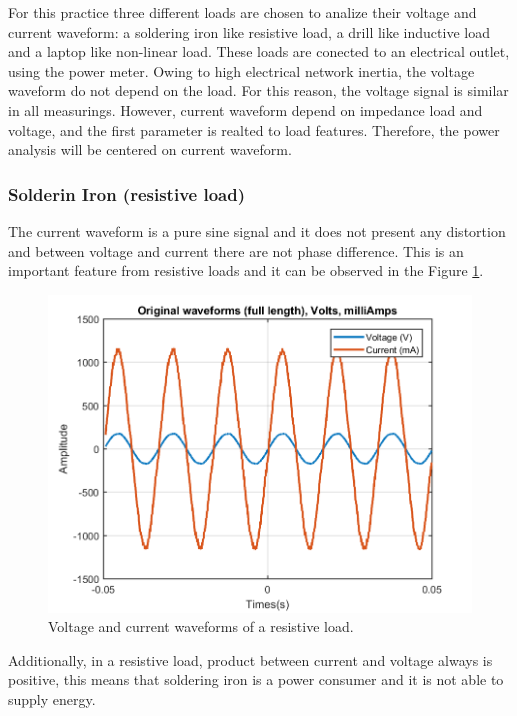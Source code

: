 \documentclass[journal]{IEEEtran}
\begin{document}
For this practice three different loads are chosen to 
analize their voltage and current waveform: 
a soldering iron 
like resistive load, a drill like inductive load and 
a laptop like non-linear load. These loads are conected 
to an electrical outlet, using the power meter. Owing to 
high electrical network inertia, the voltage waveform do
not depend on the load. For this reason, the voltage signal
is similar in all measurings. However, current waveform 
depend on impedance load and voltage, and the first 
parameter is realted to load features. Therefore, the 
power analysis will be centered on current waveform.\\

\subsubsection{Solderin Iron (resistive load)}
The current waveform is a pure sine signal and it does not 
present any distortion and between voltage and current there
are not phase difference. This is an important feature 
from resistive loads and it can be observed in the Figure
\ref{original_resistive_load}. 

\begin{figure}[h]
\centering
\includegraphics[clip,width=\columnwidth]{original_waveform_cautin.png}
\caption{Voltage and current waveforms of a resistive load.}
\label{original_resistive_load}
\end{figure}

Additionally, in a resistive load, product between 
current and voltage always 
is positive, this means that soldering iron is a power 
consumer and it is not able to supply energy. 
\end{document}
